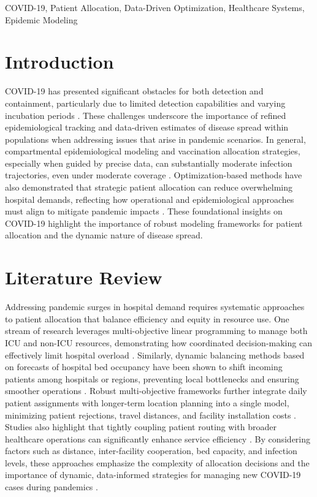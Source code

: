 \documentclass{article}
\begin{document}
  \begin{ieomkeywords}
    COVID-19, Patient Allocation, Data-Driven Optimization, Healthcare Systems, Epidemic Modeling
  \end{ieomkeywords}

\section{Introduction}
COVID-19 has presented significant obstacles for both detection and containment, particularly due to limited detection capabilities and varying incubation periods \parencite{li2020modeling, lauer2020incubation, meyerowitz2020systematic}. These challenges underscore the importance of refined epidemiological tracking and data-driven estimates of disease spread within populations when addressing issues that arise in pandemic scenarios. In general, compartmental epidemiological modeling and vaccination allocation strategies, especially when guided by precise data, can substantially moderate infection trajectories, even under moderate coverage \parencite{waseel2024assessing}. Optimization-based methods have also demonstrated that strategic patient allocation can reduce overwhelming hospital demands, reflecting how operational and epidemiological approaches must align to mitigate pandemic impacts \parencite{sarkar2021covid}. These foundational insights on COVID-19 highlight the importance of robust modeling frameworks for patient allocation and the dynamic nature of disease spread.

\section{Literature Review}
Addressing pandemic surges in hospital demand requires systematic approaches to patient allocation that balance efficiency and equity in resource use. One stream of research leverages multi-objective linear programming to manage both ICU and non-ICU resources, demonstrating how coordinated decision-making can effectively limit hospital overload \parencite{aydin2022analyses}. Similarly, dynamic balancing methods based on forecasts of hospital bed occupancy have been shown to shift incoming patients among hospitals or regions, preventing local bottlenecks and ensuring smoother operations \parencite{dijkstra2023dynamic}. Robust multi-objective frameworks further integrate daily patient assignments with longer-term location planning into a single model, minimizing patient rejections, travel distances, and facility installation costs \parencite{eriskin2024robust}. Studies also highlight that tightly coupling patient routing with broader healthcare operations can significantly enhance service efficiency \parencite{yinusa2023optimizing, shi2023data}. By considering factors such as distance, inter-facility cooperation, bed capacity, and infection levels, these approaches emphasize the complexity of allocation decisions and the importance of dynamic, data-informed strategies for managing new COVID-19 cases during pandemics \parencite{sarkar2021covid}.
\end{document}
